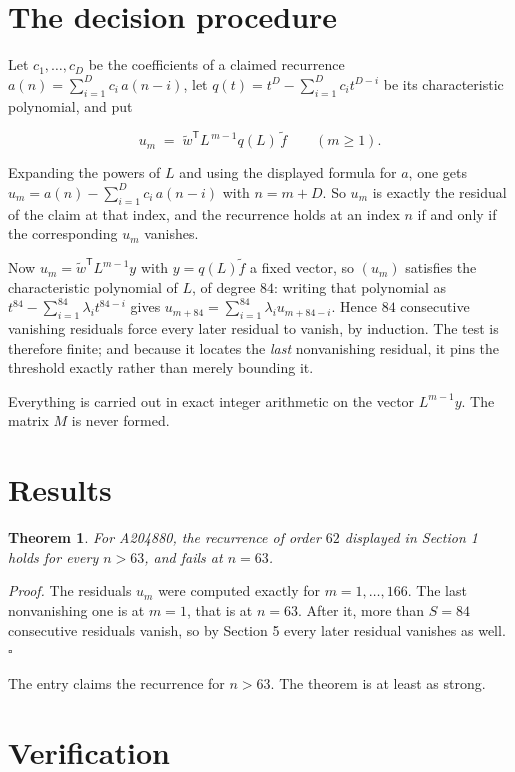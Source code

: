 \documentclass[11pt]{article}
\newtheorem{theorem}{Theorem}
\theoremstyle{definition}
\begin{document}
\section{The decision procedure}

Let $c_1,\dots,c_D$ be the coefficients of a claimed recurrence $a(n) = \sum_{i=1}^{D} c_i\,a(n-i)$, let $q(t) = t^{D} - \sum_{i=1}^{D} c_i t^{D-i}$ be its characteristic polynomial, and put

\[u_m \;=\; \tilde w^{\mathsf T} L^{\,m-1} q(L)\,\tilde f \qquad (m \ge 1).\]

Expanding the powers of $L$ and using the displayed formula for $a$, one gets $u_m = a(n) - \sum_{i=1}^{D} c_i\,a(n-i)$ with $n = m + D$. So $u_m$ is exactly the residual of the claim at that index, and the recurrence holds at an index $n$ if and only if the corresponding $u_m$ vanishes.

Now $u_m = \tilde w^{\mathsf T} L^{m-1} y$ with $y = q(L)\tilde f$ a fixed vector, so $(u_m)$ satisfies the characteristic polynomial of $L$, of degree $84$: writing that polynomial as $t^{84} - \sum_{i=1}^{84} \lambda_i t^{84-i}$ gives $u_{m+84} = \sum_{i=1}^{84} \lambda_i u_{m+84-i}$. Hence $84$ consecutive vanishing residuals force every later residual to vanish, by induction. The test is therefore finite; and because it locates the {\itshape last} nonvanishing residual, it pins the threshold exactly rather than merely bounding it.

Everything is carried out in exact integer arithmetic on the vector $L^{m-1}y$. The matrix $M$ is never formed.

\section{Results}

\begin{theorem} For A204880, the recurrence of order $62$ displayed in Section 1 holds for every $n > 63$, and fails at $n = 63$.\end{theorem}

{\itshape Proof.} The residuals $u_m$ were computed exactly for $m = 1,\dots,166$. The last nonvanishing one is at $m = 1$, that is at $n = 63$. After it, more than $S = 84$ consecutive residuals vanish, so by Section 5 every later residual vanishes as well. $\square$

The entry claims the recurrence for $n > 63$. The theorem is at least as strong.

\section{Verification}
\end{document}
